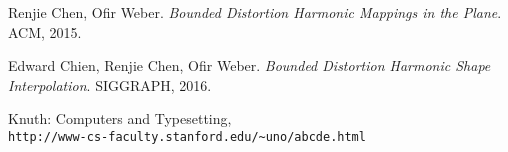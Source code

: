 \newpage

\begin{thebibliography}{9}
	Renjie Chen, Ofir Weber.
	\textit{Bounded Distortion Harmonic Mappings in the Plane}. 
	ACM, 2015. 
	
	Edward Chien, Renjie Chen, Ofir Weber. 
	\textit{Bounded Distortion Harmonic Shape Interpolation}.
	SIGGRAPH, 2016.
	
	Knuth: Computers and Typesetting,
	\\\texttt{http://www-cs-faculty.stanford.edu/\~{}uno/abcde.html}
\end{thebibliography}